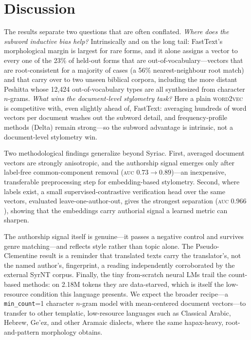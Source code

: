 \documentclass[11pt]{article}
\newcommand{\auc}{\textsc{auc}}
\newcommand{\auc}{\textsc{auc}}
\begin{document}


\section{Discussion}
\label{sec:discussion}
The results separate two questions that are often conflated. \emph{Where does the
subword inductive bias help?} Intrinsically and on the long tail: FastText's
morphological margin is largest for rare forms, and it alone assigns a vector to
every one of the 23\% of held-out forms that are out-of-vocabulary---vectors that
are root-consistent for a majority of cases (a 56\% nearest-neighbour root match)
and that carry over to two unseen biblical corpora, including the more distant
Peshitta whose 12{,}424 out-of-vocabulary types are all synthesized from character
$n$-grams. \emph{What wins the document-level stylometry task?} Here a plain
\textsc{word2vec} is competitive with, even slightly ahead of, FastText: averaging
hundreds of word vectors per document washes out the subword detail, and
frequency-profile methods (Delta) remain strong---so the subword advantage is
intrinsic, not a document-level stylometry win.

Two methodological findings generalize beyond Syriac. First, averaged document
vectors are strongly anisotropic, and the authorship signal emerges only after
label-free common-component removal (\auc{} $0.73\to0.89$)---an inexpensive,
transferable preprocessing step for embedding-based stylometry. Second, where
labels exist, a small supervised-contrastive verification head over the same
vectors, evaluated leave-one-author-out, gives the strongest separation (\auc{}
$0.966$), showing that the embeddings carry authorial signal a learned metric can
sharpen.

The authorship signal itself is genuine---it passes a negative control and
survives genre matching---and reflects style rather than topic alone. The
Pseudo-Clementine result is a reminder that translated texts carry the
translator's, not the named author's, fingerprint, a reading independently
corroborated by the external SyrNT corpus. Finally, the tiny from-scratch neural
LMs trail the count-based methods: on 2.18M tokens they are data-starved, which is
itself the low-resource condition this language presents. We expect the broader
recipe---a \texttt{min\_count}=1 character $n$-gram model with mean-centered
document vectors---to transfer to other templatic, low-resource languages such as
Classical Arabic, Hebrew, Ge'ez, and other Aramaic dialects, where the same
hapax-heavy, root-and-pattern morphology obtains.
\end{document}
